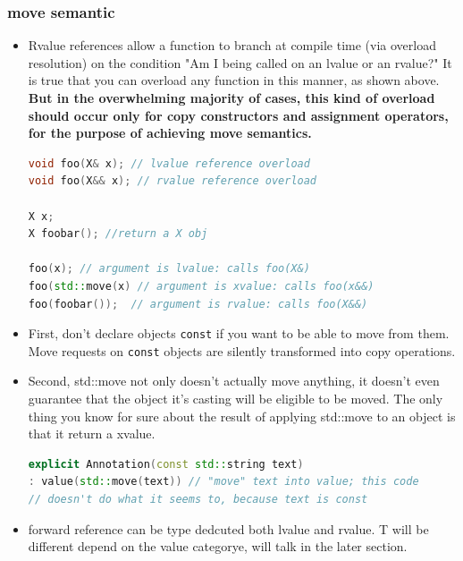\documentclass[a4paper,12pt,twoside]{book}
\begin{document}
\subsubsection{move semantic}
\begin{itemize}

\item Rvalue references allow a function to branch at compile time (via overload resolution) on the condition "Am I being called on an lvalue or an rvalue?" It is true that you can overload any function in this manner, as shown above. \textbf{But in the overwhelming majority of cases, this kind of overload should occur only for copy constructors and assignment operators, for the purpose of achieving move semantics. }

\begin{lstlisting}[frame=single, language=c++]
void foo(X& x); // lvalue reference overload
void foo(X&& x); // rvalue reference overload

X x;
X foobar(); //return a X obj

foo(x); // argument is lvalue: calls foo(X&)
foo(std::move(x) // argument is xvalue: calls foo(x&&)
foo(foobar());  // argument is rvalue: calls foo(X&&)
\end{lstlisting}	

\item First, don't declare objects \texttt{const} if you want to be able to move from them. Move requests on \texttt{const} objects are silently transformed into copy operations.

\item Second, std::move not only doesn't actually move anything, it doesn't even guarantee that the object it's casting will be eligible to be moved. The only thing you know for sure about the result of applying std::move to an object is that it return a xvalue.

\begin{lstlisting}[frame=single, language=c++]
explicit Annotation(const std::string text)
: value(std::move(text)) // "move" text into value; this code
// doesn't do what it seems to, because text is const
\end{lstlisting}

\item forward reference can be type dedcuted both lvalue and rvalue. T will be different depend on the value categorye, will talk in the later section.

\end{itemize}
\end{document}

